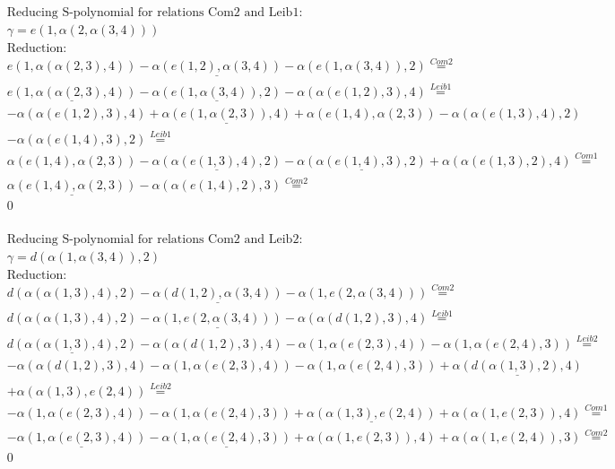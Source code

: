 \documentclass[11pt]{amsart}
\begin{document}
\begin{align*} 
& \text{Reducing S-polynomial for relations Com2 and Leib1:} \\ 
& \gamma = e(1,\alpha(2,\alpha(3,4))) \\ 
& \text{Reduction}: \\&e(1,\alpha(\alpha(2,3),4)) - \underline{\alpha(e(1,2),\alpha(3,4))} - \alpha(e(1,\alpha(3,4)),2) \stackrel{ Com2 }{=}  \\ 
&\underline{e(1,\alpha(\alpha(2,3),4))} - \underline{\alpha(e(1,\alpha(3,4)),2)} - \alpha(\alpha(e(1,2),3),4) \stackrel{ Leib1 }{=}  \\ 
& - \alpha(\alpha(e(1,2),3),4) + \underline{\alpha(e(1,\alpha(2,3)),4)} + \alpha(e(1,4),\alpha(2,3)) - \alpha(\alpha(e(1,3),4),2)\\ 
 &  - \alpha(\alpha(e(1,4),3),2) \stackrel{ Leib1 }{=}  \\ 
&\alpha(e(1,4),\alpha(2,3)) - \underline{\alpha(\alpha(e(1,3),4),2)} - \underline{\alpha(\alpha(e(1,4),3),2)} + \alpha(\alpha(e(1,3),2),4) \stackrel{ Com1 }{=}  \\ 
&\underline{\alpha(e(1,4),\alpha(2,3))} - \alpha(\alpha(e(1,4),2),3) \stackrel{ Com2 }{=}  \\ 
&0\\ 
\end{align*} 
 
\begin{align*} 
& \text{Reducing S-polynomial for relations Com2 and Leib2:} \\ 
& \gamma = d(\alpha(1,\alpha(3,4)),2) \\ 
& \text{Reduction}: \\&d(\alpha(\alpha(1,3),4),2) - \underline{\alpha(d(1,2),\alpha(3,4))} - \alpha(1,e(2,\alpha(3,4))) \stackrel{ Com2 }{=}  \\ 
&d(\alpha(\alpha(1,3),4),2) - \underline{\alpha(1,e(2,\alpha(3,4)))} - \alpha(\alpha(d(1,2),3),4) \stackrel{ Leib1 }{=}  \\ 
&\underline{d(\alpha(\alpha(1,3),4),2)} - \alpha(\alpha(d(1,2),3),4) - \alpha(1,\alpha(e(2,3),4)) - \alpha(1,\alpha(e(2,4),3)) \stackrel{ Leib2 }{=}  \\ 
& - \alpha(\alpha(d(1,2),3),4) - \alpha(1,\alpha(e(2,3),4)) - \alpha(1,\alpha(e(2,4),3)) + \underline{\alpha(d(\alpha(1,3),2),4)}\\ 
 &  + \alpha(\alpha(1,3),e(2,4)) \stackrel{ Leib2 }{=}  \\ 
& - \alpha(1,\alpha(e(2,3),4)) - \alpha(1,\alpha(e(2,4),3)) + \underline{\alpha(\alpha(1,3),e(2,4))} + \alpha(\alpha(1,e(2,3)),4) \stackrel{ Com1 }{=}  \\ 
& - \underline{\alpha(1,\alpha(e(2,3),4))} - \underline{\alpha(1,\alpha(e(2,4),3))} + \alpha(\alpha(1,e(2,3)),4) + \alpha(\alpha(1,e(2,4)),3) \stackrel{ Com2 }{=}  \\ 
&0\\ 
\end{align*} 
 
\end{document}

